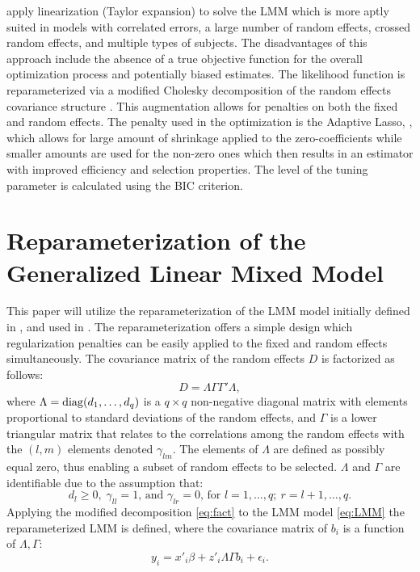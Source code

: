 \documentclass{article}
\begin{document}
\cite{BKG2010} apply linearization (Taylor expansion) to solve the LMM which is more aptly suited in models with correlated errors, a large number of random effects, crossed random effects, and multiple types of subjects. The disadvantages of this approach include the absence of a true objective function for the overall optimization process and potentially biased estimates. The likelihood function is reparameterized via a modified Cholesky decomposition of the random effects covariance structure \cite{ChenDunson2003}. This augmentation allows for penalties on both the fixed and random effects. The penalty used in the optimization is the Adaptive Lasso, \cite{Zou2006}, which allows for large amount of shrinkage applied to the zero-coefficients while smaller amounts are used for the non-zero ones which then results in an estimator with improved efficiency and selection properties. The level of the tuning parameter is calculated using the BIC criterion.

\section{Reparameterization of the Generalized Linear Mixed Model}
This paper will utilize the reparameterization of the LMM model initially defined in \cite{ChenDunson2003}, and used in \cite{BKG2010}. The reparameterization offers a simple design which regularization penalties can be easily applied to the fixed and random effects simultaneously. The covariance matrix of the random effects $D$ is factorized as follows:
%
		\begin{equation}
			\label{eq:fact}
			D=\Lambda\Gamma\Gamma'\Lambda,
		\end{equation}
%		
where $\Lambda=\mathop{\rm diag}(d_1,\dots,d_q)$ is a $q\times q$ non-negative diagonal matrix with elements proportional to standard deviations  of the random effects, and $\Gamma$ is a lower triangular matrix that relates to the correlations among the random effects with the $(l,m)$ elements denoted $\gamma_{lm}$. The elements of $\Lambda$ are defined as possibly equal zero, thus enabling a subset of random effects to be selected. $\Lambda$ and $\Gamma$ are identifiable due to the assumption that:
%
$$d_l\ge 0,\;\gamma_{ll}=1 \text{, and }\gamma_{lr}=0 \text{, for } l=1,\dots,q;\:r=l+1,\dots,q.$$
%		
Applying the modified decomposition \eqref{eq:fact} to the LMM model \eqref{eq:LMM} the reparameterized LMM is defined, where the covariance matrix of \textbf{$b_i$} is a function of $\Lambda,\Gamma$:
%		
		\begin{equation*}
			y_i=x'_i\beta+z'_i\Lambda\Gamma b_i+\epsilon_i.
		\end{equation*}
%
\end{document}
